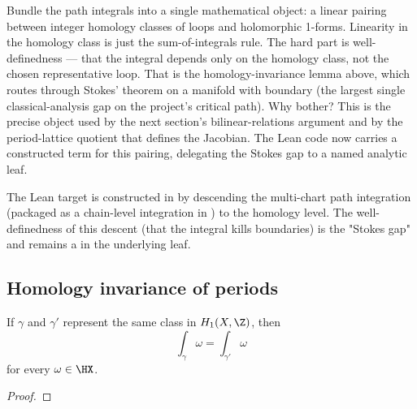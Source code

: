 \begin{layman}
Bundle the path integrals into a single mathematical object: a
linear pairing between integer homology classes of loops and
holomorphic 1-forms. Linearity in the homology class is just the
sum-of-integrals rule. The hard part is well-definedness --- that
the integral depends only on the homology class, not the chosen
representative loop. That is the homology-invariance lemma above,
which routes through Stokes' theorem on a manifold with boundary
(the largest single classical-analysis gap on the project's
critical path). Why bother? This is the precise object used by
the next section's bilinear-relations argument and by the
period-lattice quotient that defines the Jacobian. The Lean code now
carries a constructed term for this pairing, delegating the Stokes
gap to a named analytic leaf.
\end{layman}

\begin{proofsketch}
The Lean target  is
constructed in
 by descending the
multi-chart path integration  (packaged
as a chain-level integration in
) to the
homology level. The well-definedness of this descent (that the
integral kills boundaries) is the "Stokes gap" and remains a
 in the underlying 
leaf.
\end{proofsketch}

\subsection{Homology invariance of periods}

\begin{lemma}
\label{lem:period-homology-invariance}
If \(\gamma\) and \(\gamma'\) represent the same class in \(H_1(X,\Z)\), then
\[
  \int_{\gamma}\omega=\int_{\gamma'}\omega
\]
for every \(\omega\in\HX\).
\leanok
\end{lemma}
\begin{proof}\leanok\end{proof}

